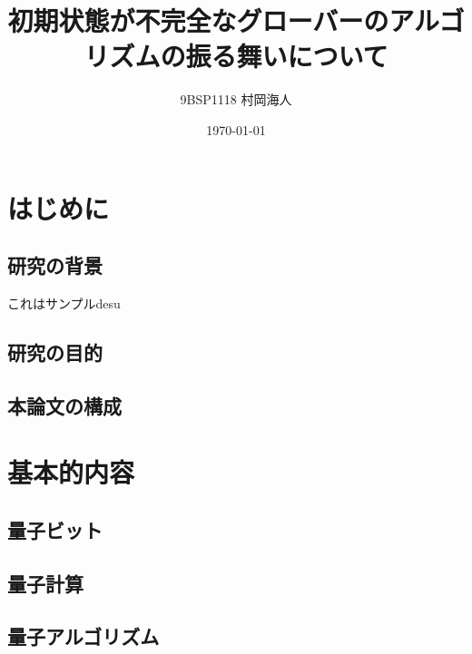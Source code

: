 \documentclass[platex,dvipdfmx, titlepage]{jlreq}			%
\title{初期状態が不完全なグローバーのアルゴリズムの振る舞いについて}
\author{9BSP1118 村岡海人}
\date{\today}
\begin{document}
\maketitle
\section{はじめに}
\subsection{研究の背景}
これはサンプルdesu
\subsection{研究の目的}

\subsection{本論文の構成}

\section{基本的内容}
\subsection{量子ビット}

\subsection{量子計算}

\subsection{量子アルゴリズム}



\end{document}
